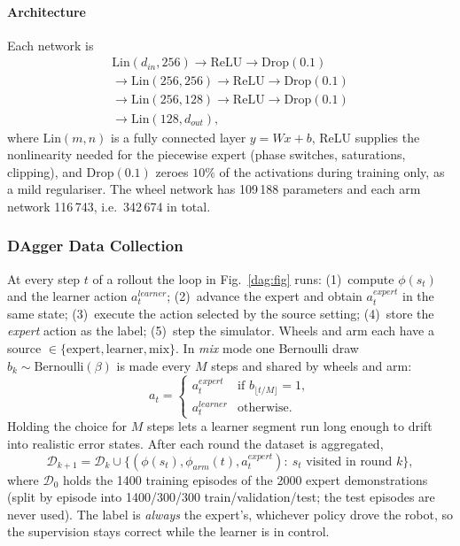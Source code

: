 \documentclass[conference]{IEEEtran}
\newcommand{\dagD}{\mathcal{D}}                        %
\begin{document}
\paragraph{Architecture} Each network is
\begin{multline*}
  \mathrm{Lin}(d_{in},256)\to\mathrm{ReLU}\to\mathrm{Drop}(0.1)\\
  \to\mathrm{Lin}(256,256)\to\mathrm{ReLU}\to\mathrm{Drop}(0.1)\\
  \to\mathrm{Lin}(256,128)\to\mathrm{ReLU}\to\mathrm{Drop}(0.1)\\
  \to\mathrm{Lin}(128,d_{out}),
\end{multline*}
where $\mathrm{Lin}(m,n)$ is a fully connected layer $y=Wx+b$, ReLU supplies the nonlinearity needed for the piecewise expert (phase switches, saturations, clipping), and $\mathrm{Drop}(0.1)$ zeroes $10\%$ of the activations during training only, as a mild regulariser. The wheel network has 109\,188 parameters and each arm network 116\,743, i.e.\ 342\,674 in total.

\subsubsection{DAgger Data Collection}
\label{dag:collect}

At every step $t$ of a rollout the loop in Fig.~\ref{dag:fig} runs: (1)~compute $\phi(s_t)$ and the learner action $a_t^{learner}$; (2)~advance the expert and obtain $a_t^{expert}$ in the same state; (3)~execute the action selected by the source setting; (4)~store the \emph{expert} action as the label; (5)~step the simulator. Wheels and arm each have a source $\in\{\text{expert},\text{learner},\text{mix}\}$. In \emph{mix} mode one Bernoulli draw $b_k\sim\mathrm{Bernoulli}(\beta)$ is made every $M$ steps and shared by wheels and arm:
\begin{equation}
  a_t=\begin{cases}a_t^{expert}&\text{if }b_{\lfloor t/M\rfloor}=1,\\ a_t^{learner}&\text{otherwise.}\end{cases}
  \label{dag:mix}
\end{equation}
Holding the choice for $M$ steps lets a learner segment run long enough to drift into realistic error states. After each round the dataset is aggregated,
\begin{equation}
  \dagD_{k+1}=\dagD_{k}\cup\bigl\{(\phi(s_t),\phi_{arm}(t),a_t^{expert}):\ s_t\text{ visited in round }k\bigr\},
\label{dag:agg}
\end{equation}
where $\dagD_0$ holds the 1400 training episodes of the 2000 expert demonstrations (split by episode into 1400/300/300 train/validation/test; the test episodes are never used). The label is \emph{always} the expert's, whichever policy drove the robot, so the supervision stays correct while the learner is in control.
\end{document}
